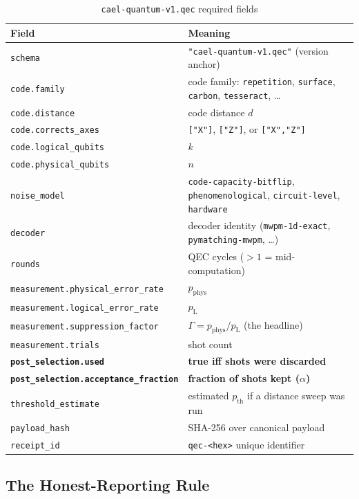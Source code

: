 \documentclass[conference]{IEEEtran}
\newcommand{\pL}{p_{\mathrm{L}}}    %
\newcommand{\pP}{p_{\mathrm{phys}}} %
\newcommand{\pth}{p_{\mathrm{th}}}  %
\newcommand{\af}{\alpha}            %
\newcommand{\suppfactor}{\Gamma}    %
\begin{document}
\begin{table}[t]
\caption{\texttt{cael-quantum-v1.qec} required fields}
\label{tab:schema}
\small
\begin{tabular}{@{}p{2.8cm}p{4.8cm}@{}}
\toprule
\textbf{Field} & \textbf{Meaning} \\
\midrule
\texttt{schema} & \texttt{"cael-quantum-v1.qec"} (version anchor) \\
\texttt{code.family} & code family: \texttt{repetition}, \texttt{surface}, \texttt{carbon}, \texttt{tesseract}, \ldots \\
\texttt{code.distance} & code distance $d$ \\
\texttt{code.corrects\_axes} & \texttt{["X"]}, \texttt{["Z"]}, or \texttt{["X","Z"]} \\
\texttt{code.logical\_qubits} & $k$ \\
\texttt{code.physical\_qubits} & $n$ \\
\texttt{noise\_model} & \texttt{code-capacity-bitflip}, \texttt{phenomenological}, \texttt{circuit-level}, \texttt{hardware} \\
\texttt{decoder} & decoder identity (\texttt{mwpm-1d-exact}, \texttt{pymatching-mwpm}, \ldots) \\
\texttt{rounds} & QEC cycles ($>1$ = mid-computation) \\
\texttt{measurement.physical\_error\_rate} & $\pP$ \\
\texttt{measurement.logical\_error\_rate} & $\pL$ \\
\texttt{measurement.suppression\_factor} & $\suppfactor = \pP / \pL$ (the headline) \\
\texttt{measurement.trials} & shot count \\
\textbf{\texttt{post\_selection.used}} & \textbf{true iff shots were discarded} \\
\textbf{\texttt{post\_selection.acceptance\_fraction}} & \textbf{fraction of shots kept ($\af$)} \\
\texttt{threshold\_estimate} & estimated $\pth$ if a distance sweep was run \\
\texttt{payload\_hash} & SHA-256 over canonical payload \\
\texttt{receipt\_id} & \texttt{qec-<hex>} unique identifier \\
\bottomrule
\end{tabular}
\end{table}

\subsection{The Honest-Reporting Rule}
\end{document}
